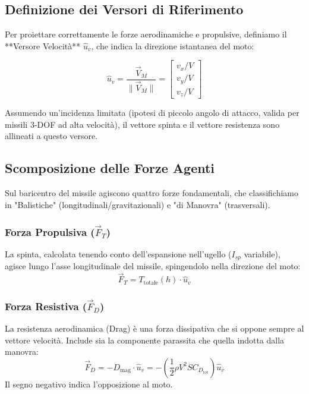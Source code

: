 \documentclass[12pt,a4paper]{article}
\begin{document}
\subsection{Definizione dei Versori di Riferimento}
Per proiettare correttamente le forze aerodinamiche e propulsive, definiamo il **Versore Velocità** $\hat{u}_v$, che indica la direzione istantanea del moto:

\begin{equation}
    \hat{u}_v = \frac{\vec{V}_M}{\|\vec{V}_M\|} = \begin{bmatrix} v_x / V \\ v_y / V \\ v_z / V \end{bmatrix}
\end{equation}

Assumendo un'incidenza limitata (ipotesi di piccolo angolo di attacco, valida per missili 3-DOF ad alta velocità), il vettore spinta e il vettore resistenza sono allineati a questo versore.

\subsection{Scomposizione delle Forze Agenti}
Sul baricentro del missile agiscono quattro forze fondamentali, che classifichiamo in "Balistiche" (longitudinali/gravitazionali) e "di Manovra" (trasversali).

\subsubsection{Forza Propulsiva ($\vec{F}_T$)}
La spinta, calcolata tenendo conto dell'espansione nell'ugello ($I_{sp}$ variabile), agisce lungo l'asse longitudinale del missile, spingendolo nella direzione del moto:
\begin{equation}
    \vec{F}_T = T_{\text{totale}}(h) \cdot \hat{u}_v
\end{equation}

\subsubsection{Forza Resistiva ($\vec{F}_D$)}
La resistenza aerodinamica (Drag) è una forza dissipativa che si oppone sempre al vettore velocità. Include sia la componente parassita che quella indotta dalla manovra:
\begin{equation}
    \vec{F}_D = - D_{\text{mag}} \cdot \hat{u}_v = - \left( \frac{1}{2} \rho V^2 S C_{D_{\text{tot}}} \right) \hat{u}_v
\end{equation}
Il segno negativo indica l'opposizione al moto.
\end{document}
